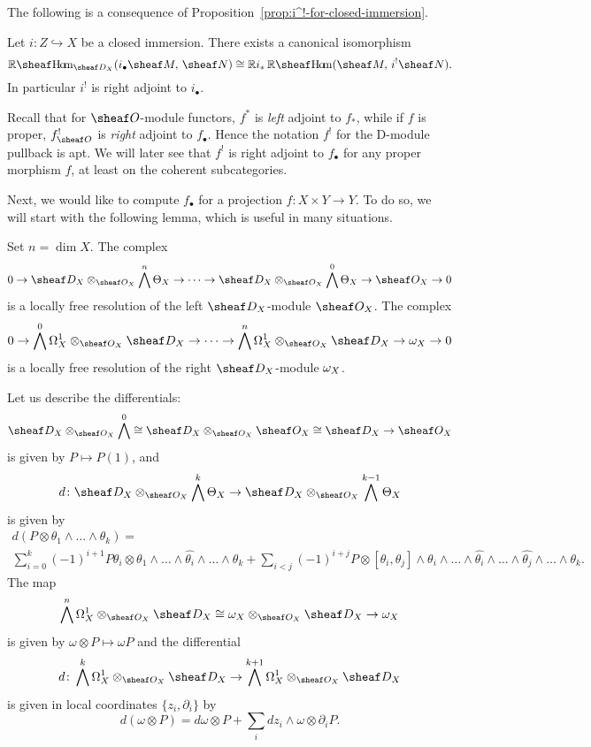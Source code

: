 \documentclass[number-in-sections,a4paper]{notes}
\begin{document}
The following is a consequence of Proposition~\ref{prop:i^!-for-closed-immersion}.

\begin{Proposition}
    Let $i\colon Z \hookrightarrow X$ be a closed immersion.
    There exists a canonical isomorphism
    \[
        \sheafRHom_{\sD_X}(i_\bullet \sheaf M,\, \sheaf N) \cong \RR i_*\sheafRHom(\sheaf M,\, i^!\sheaf N).
    \]
    In particular $i^!$ is right adjoint to $i_\bullet$.
\end{Proposition}

\begin{Remark}
    Recall that for $\sO$-module functors, $f^*$ is \emph{left} adjoint to $f_*$, while if $f$ is proper, $f_{\sO}^!$ is \emph{right} adjoint to $f_\bullet$.
    Hence the notation $f^!$ for the D-module pullback is apt.
    We will later see that $f^!$ is right adjoint to $f_\bullet$ for any proper morphism $f$, at least on the coherent subcategories.
\end{Remark}

Next, we would like to compute $f_\bullet$ for a projection $f\colon X \times Y \to Y$.
To do so, we will start with the following lemma, which is useful in many situations.

\begin{Lemma}\label{lem:spencer_resolution}
    Set $n = \dim X$.
    The complex
    \[
        0 \to
        \sD_{X} \otimes_{\sO_X} \bigwedge^n \tb X \to
        \dots \to
        \sD_{X} \otimes_{\sO_X} \bigwedge^0 \tb X \to
        \sO_X \to 0
    \]
    is a locally free resolution of the left $\sD_X$-module $\sO_X$.
    The complex
    \[
        0 \to
        \bigwedge^0 \ctb X \otimes_{\sO_X} \sD_X \to
        \dots \to
        \bigwedge^n \ctb X \otimes_{\sO_X} \sD_X \to
        \canon_X \to 0
    \]
    is a locally free resolution of the right $\sD_X$-module $\omega_X$.
\end{Lemma}

Let us describe the differentials:
\[
    \sD_{X} \otimes_{\sO_X} \bigwedge^0 \cong
    \sD_{X} \otimes_{\sO_X} \sO_X \cong
    \sD_X
    \to
    \sO_X
\]
is given by $P \mapsto P(1)$, and
\[
    d\colon \sD_{X} \otimes_{\sO_X} \bigwedge^k \tb X \to
    \sD_{X} \otimes_{\sO_X} \bigwedge^{k-1} \tb X
\]
is given by
\begin{multline*}
    d(P \otimes \theta_1 \wedge \dots \wedge \theta_k) = \\
    \sum_{i=0}^k (-1)^{i+1} P\theta_i \otimes \theta_1 \wedge \dots \wedge \widehat{\theta_i} \wedge \dots \wedge \theta_k + \sum_{i < j} (-1)^{i+j} P \otimes [\theta_i,\theta_j] \wedge \theta_i \wedge \dots \wedge \widehat{\theta_i} \wedge \dots \wedge \widehat{\theta_j} \wedge \dots \wedge \theta_k.
\end{multline*}
The map
\[
    \bigwedge^n \ctb X \otimes_{\sO_X} \sD_X \cong
    \canon_X \otimes_{\sO_X} \sD_X \to
    \canon_X
\]
is given by $\omega \otimes P \mapsto \omega P$ and the differential
\[
    d\colon \bigwedge^k \ctb X \otimes_{\sO_X} \sD_X \to
    \bigwedge^{k+1} \ctb X \otimes_{\sO_X} \sD_X
\]
is given in local coordinates $\{z_i, \partial_i\}$ by
\[
    d(\omega \otimes P) = d\omega \otimes P + \sum_i dz_i \wedge \omega \otimes \partial_i P.
\]
\end{document}
